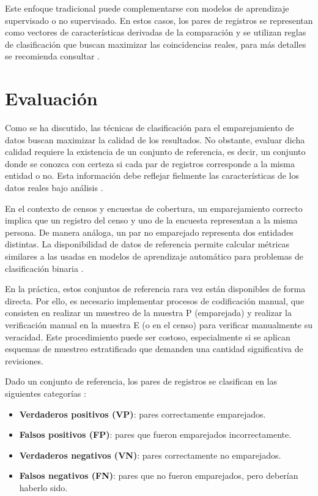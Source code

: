 \documentclass[
  12pt,
]{book}
\providecommand{\tightlist}{%
  \setlength{\itemsep}{0pt}\setlength{\parskip}{0pt}}
\begin{document}
Este enfoque tradicional puede complementarse con modelos de aprendizaje supervisado o no supervisado. En estos casos, los pares de registros se representan como vectores de características derivadas de la comparación y se utilizan reglas de clasificación que buscan maximizar las coincidencias reales, para más detalles se recomienda consultar \citep[Capítulo 6]{christen2012data}.

\section{Evaluación}\label{evaluaciuxf3n}

Como se ha discutido, las técnicas de clasificación para el emparejamiento de datos buscan maximizar la calidad de los resultados. No obstante, evaluar dicha calidad requiere la existencia de un conjunto de referencia, es decir, un conjunto donde se conozca con certeza si cada par de registros corresponde a la misma entidad o no. Esta información debe reflejar fielmente las características de los datos reales bajo análisis \citep{christen2012data}.

En el contexto de censos y encuestas de cobertura, un emparejamiento correcto implica que un registro del censo y uno de la encuesta representan a la misma persona. De manera análoga, un par no emparejado representa dos entidades distintas. La disponibilidad de datos de referencia permite calcular métricas similares a las usadas en modelos de aprendizaje automático para problemas de clasificación binaria \citep{menestrina2010evaluating}.

En la práctica, estos conjuntos de referencia rara vez están disponibles de forma directa. Por ello, es necesario implementar procesos de codificación manual, que consisten en realizar un muestreo de la muestra P (emparejada) y realizar la verificación manual en la muestra E (o en el censo) para verificar manualmente su veracidad. Este procedimiento puede ser costoso, especialmente si se aplican esquemas de muestreo estratificado que demanden una cantidad significativa de revisiones.

Dado un conjunto de referencia, los pares de registros se clasifican en las siguientes categorías \citep{christen2012data}:

\begin{itemize}
\tightlist
\item
  \textbf{Verdaderos positivos (VP)}: pares correctamente emparejados.\\
\item
  \textbf{Falsos positivos (FP)}: pares que fueron emparejados incorrectamente.\\
\item
  \textbf{Verdaderos negativos (VN)}: pares correctamente no emparejados.\\
\item
  \textbf{Falsos negativos (FN)}: pares que no fueron emparejados, pero deberían haberlo sido.
\end{itemize}
\end{document}
